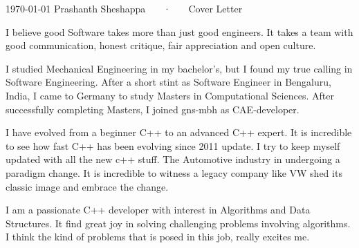 \documentclass[11pt, a4paper]{awesome-cv}
\begin{document}
\makecvheader[R]

\makecvfooter
  {\today}
  {Prashanth Sheshappa ~~~·~~~ Cover Letter}
  {}

\makelettertitle

\begin{cvletter}

I believe good Software takes more than just good engineers. It takes a team with good communication, honest critique, fair appreciation and open culture.

I studied Mechanical Engineering in my bachelor's, but I found my true calling in Software Engineering.
After a short stint as Software Engineer in Bengaluru, India, I came to Germany to study Masters in Computational Sciences.
After successfully completing Masters, I joined gns-mbh as CAE-developer. 

I have evolved from a beginner C++ to an advanced C++ expert. It is incredible to see how fast C++ has been evolving since 2011 update.
I try to keep myself updated with all the new c++ stuff.
The Automotive industry in undergoing a paradigm change. 
It is incredible to witness a legacy company like VW shed its classic image and embrace the change. 


I am a passionate C++ developer with interest in Algorithms and Data Structures.
It find great joy in solving challenging problems involving algorithms. 
I think the kind of problems that is posed in this job, really excites me. 


\end{cvletter}


\makeletterclosing
\end{document}
